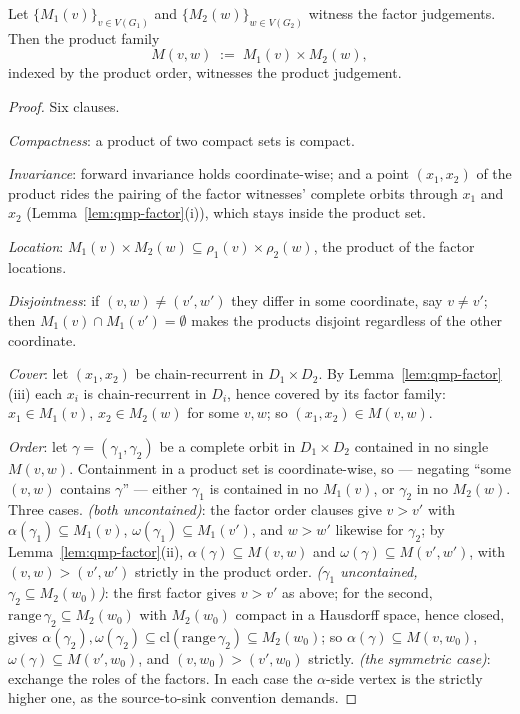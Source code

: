 \begin{blemma}\label{lem:qmp-transport}
Let $\{M_1(v)\}_{v \in V(G_1)}$ and $\{M_2(w)\}_{w \in V(G_2)}$
witness the factor judgements. Then the product family
\[
M(v, w) \;:=\; M_1(v) \times M_2(w),
\]
indexed by the product order, witnesses the product judgement.
\end{blemma}
\begin{proof}
Six clauses.

\emph{Compactness}: a product of two compact sets is compact.

\emph{Invariance}: forward invariance holds coordinate-wise; and a
point $(x_1, x_2)$ of the product rides the pairing of the factor
witnesses' complete orbits through $x_1$ and $x_2$
(Lemma~\ref{lem:qmp-factor}(i)), which stays inside the product set.

\emph{Location}: $M_1(v) \times M_2(w) \subseteq \rho_1(v) \times
\rho_2(w)$, the product of the factor locations.

\emph{Disjointness}: if $(v, w) \neq (v', w')$ they differ in some
coordinate, say $v \neq v'$; then $M_1(v) \cap M_1(v') = \emptyset$
makes the products disjoint regardless of the other coordinate.

\emph{Cover}: let $(x_1, x_2)$ be chain-recurrent in $D_1 \times D_2$.
By Lemma~\ref{lem:qmp-factor}(iii) each $x_i$ is chain-recurrent in
$D_i$, hence covered by its factor family: $x_1 \in M_1(v)$,
$x_2 \in M_2(w)$ for some $v, w$; so
$(x_1, x_2) \in M(v, w)$.

\emph{Order}: let $\gamma = (\gamma_1, \gamma_2)$ be a complete orbit
in $D_1 \times D_2$ contained in no single $M(v, w)$. Containment in a
product set is coordinate-wise, so
--- negating ``some $(v,w)$ contains $\gamma$'' ---
either $\gamma_1$ is contained in no $M_1(v)$, or $\gamma_2$ in no
$M_2(w)$. Three cases.
\emph{(both uncontained)}: the factor order clauses give
$v > v'$ with $\alpha(\gamma_1) \subseteq M_1(v)$,
$\omega(\gamma_1) \subseteq M_1(v')$, and $w > w'$ likewise for
$\gamma_2$; by Lemma~\ref{lem:qmp-factor}(ii),
$\alpha(\gamma) \subseteq M(v, w)$ and
$\omega(\gamma) \subseteq M(v', w')$, with
$(v, w) > (v', w')$ strictly in the product order.
\emph{($\gamma_1$ uncontained, $\gamma_2 \subseteq M_2(w_0)$)}: the
first factor gives $v > v'$ as above; for the second,
$\mathrm{range}\,\gamma_2 \subseteq M_2(w_0)$ with $M_2(w_0)$ compact
in a Hausdorff space, hence closed, gives
$\alpha(\gamma_2), \omega(\gamma_2) \subseteq
\mathrm{cl}(\mathrm{range}\,\gamma_2) \subseteq M_2(w_0)$; so
$\alpha(\gamma) \subseteq M(v, w_0)$,
$\omega(\gamma) \subseteq M(v', w_0)$, and
$(v, w_0) > (v', w_0)$ strictly.
\emph{(the symmetric case)}: exchange the roles of the factors.
In each case the $\alpha$-side vertex is the strictly higher one, as
the source-to-sink convention demands.
\end{proof}

